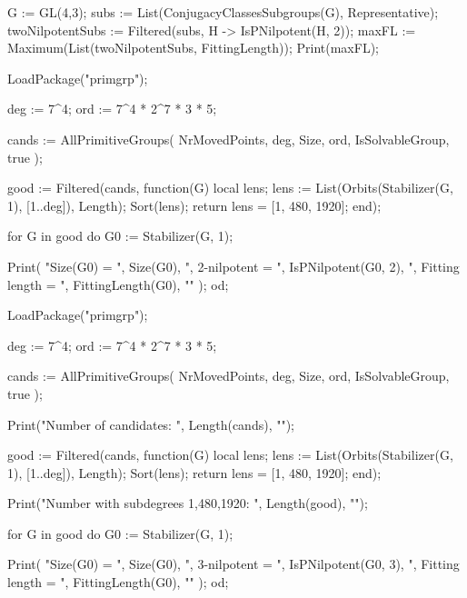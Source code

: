 
G := GL(4,3);
subs := List(ConjugacyClassesSubgroups(G), Representative);
twoNilpotentSubs := Filtered(subs, H -> IsPNilpotent(H, 2));
maxFL := Maximum(List(twoNilpotentSubs, FittingLength));
Print(maxFL);



LoadPackage("primgrp");

deg := 7^4;
ord := 7^4 * 2^7 * 3 * 5;

cands := AllPrimitiveGroups(
    NrMovedPoints, deg,
    Size, ord,
    IsSolvableGroup, true
);

good := Filtered(cands, function(G)
    local lens;
    lens := List(Orbits(Stabilizer(G, 1), [1..deg]), Length);
    Sort(lens);
    return lens = [1, 480, 1920];
end);

for G in good do
    G0 := Stabilizer(G, 1);

    Print(
        "Size(G0) = ", Size(G0),
        ", 2-nilpotent = ", IsPNilpotent(G0, 2),
        ", Fitting length = ", FittingLength(G0),
        "\n"
    );
od;



LoadPackage("primgrp");

deg := 7^4;
ord := 7^4 * 2^7 * 3 * 5;

cands := AllPrimitiveGroups(
    NrMovedPoints, deg,
    Size, ord,
    IsSolvableGroup, true
);

Print("Number of candidates: ", Length(cands), "\n");

good := Filtered(cands, function(G)
    local lens;
    lens := List(Orbits(Stabilizer(G, 1), [1..deg]), Length);
    Sort(lens);
    return lens = [1, 480, 1920];
end);

Print("Number with subdegrees 1,480,1920: ", Length(good), "\n");

for G in good do
    G0 := Stabilizer(G, 1);

    Print(
        "Size(G0) = ", Size(G0),
        ", 3-nilpotent = ", IsPNilpotent(G0, 3),
        ", Fitting length = ", FittingLength(G0),
        "\n"
    );
od;


